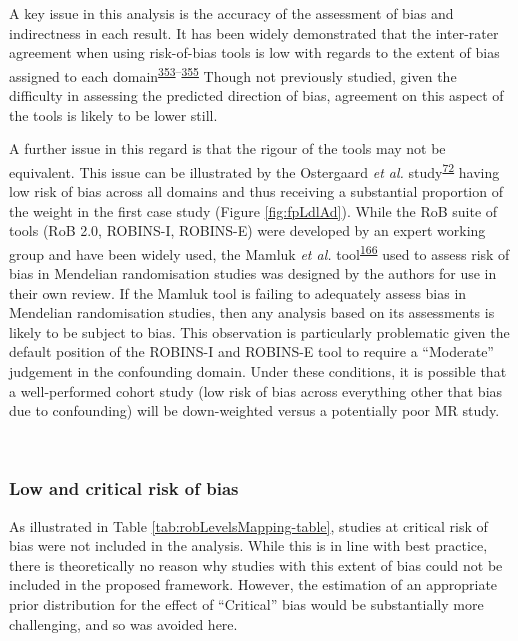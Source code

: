 \documentclass[a4paper, twoside]{templates/ociamthesis}
\begin{document}
A key issue in this analysis is the accuracy of the assessment of bias and indirectness in each result. It has been widely demonstrated that the inter-rater agreement when using risk-of-bias tools is low with regards to the extent of bias assigned to each domain\textsuperscript{\protect\hyperlink{ref-hartling2011}{353}--\protect\hyperlink{ref-minozzi2020}{355}} Though not previously studied, given the difficulty in assessing the predicted direction of bias, agreement on this aspect of the tools is likely to be lower still.

A further issue in this regard is that the rigour of the tools may not be equivalent. This issue can be illustrated by the Ostergaard \emph{et al.} study\textsuperscript{\protect\hyperlink{ref-ostergaard2015}{72}} having low risk of bias across all domains and thus receiving a substantial proportion of the weight in the first case study (Figure \ref{fig:fpLdlAd}). While the RoB suite of tools (RoB 2.0, ROBINS-I, ROBINS-E) were developed by an expert working group and have been widely used, the Mamluk \emph{et al.} tool\textsuperscript{\protect\hyperlink{ref-mamluk2020}{166}} used to assess risk of bias in Mendelian randomisation studies was designed by the authors for use in their own review. If the Mamluk tool is failing to adequately assess bias in Mendelian randomisation studies, then any analysis based on its assessments is likely to be subject to bias. This observation is particularly problematic given the default position of the ROBINS-I and ROBINS-E tool to require a ``Moderate'' judgement in the confounding domain. Under these conditions, it is possible that a well-performed cohort study (low risk of bias across everything other that bias due to confounding) will be down-weighted versus a potentially poor MR study.

~

\hypertarget{low-and-critical-risk-of-bias}{%
\subsubsection{Low and critical risk of bias}\label{low-and-critical-risk-of-bias}}

As illustrated in Table \ref{tab:robLevelsMapping-table}, studies at critical risk of bias were not included in the analysis. While this is in line with best practice, there is theoretically no reason why studies with this extent of bias could not be included in the proposed framework. However, the estimation of an appropriate prior distribution for the effect of ``Critical'' bias would be substantially more challenging, and so was avoided here.
\end{document}
